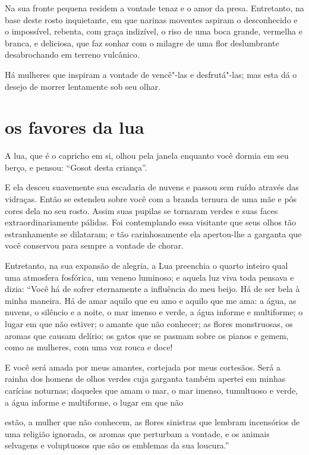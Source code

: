 Na sua fronte pequena residem a vontade tenaz e o amor da presa. Entretanto, na base deste rosto inquietante, em que narinas moventes aspiram
o desconhecido e o impossível, rebenta, com graça indizível, o riso de
uma boca grande, vermelha e branca, e deliciosa, que faz sonhar com o
milagre de uma flor deslumbrante desabrochando em terreno vulcânico.

Há mulheres que inspiram a vontade de vencê"-las e desfrutá"-las; mas
esta dá o desejo de morrer lentamente sob seu olhar.

\quebra\section[Os favores da lua]{os favores da lua}

A lua, que é o capricho em si, olhou pela janela enquanto você dormia
em seu berço, e pensou: “Gosot desta criança''.

E ela desceu suavemente sua escadaria de nuvens e passou sem ruído
através das vidraças. Então se estendeu sobre você com a branda ternura 
de uma mãe e pôs cores dela no seu rosto. Assim suas pupilas se
tornaram verdes e suas faces extraordinariamente pálidas. Foi
contemplando essa visitante que seus olhos tão estranhamente se
dilataram; e tão carinhosamente ela apertou-lhe a garganta que você
conservou para sempre a vontade de chorar.

Entretanto, na sua expansão de alegria, a Lua preenchia o quarto inteiro 
qual uma atmosfera fosfórica, um veneno luminoso; e aquela 
luz viva toda pensava e dizia: “Você há de sofrer eternamente
a influência do meu beijo. Há de ser bela à minha maneira. Há de amar
aquilo que eu amo e aquilo que me ama: a água, as nuvens, o silêncio e
a noite, o mar imenso e verde, a água informe e multiforme; o lugar em
que não estiver; o amante que não conhecer; as flores monstruosas, os
aromas que causam delírio; os gatos que se pasmam sobre os pianos e
gemem, como as mulheres, com uma voz rouca e doce!

E você será amada por meus amantes, cortejada por meus
cortesãos. Será a rainha dos homens de olhos verdes cuja
garganta também apertei em minhas carícias noturnas; daqueles que amam
o mar, o mar imenso, tumultuoso e verde, a água informe e multiforme, o
lugar em que não \linebreak

\quebra

\noindent{}estão, a mulher que não conhecem, as flores sinistras
que lembram incensórios de uma religião ignorada, os
aromas que perturbam a vontade, e os animais selvagens e voluptuosos
que são os emblemas da sua loucura.''

